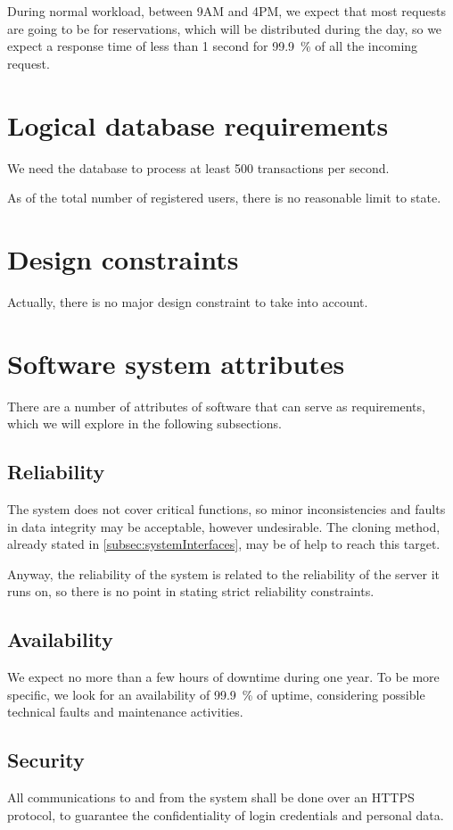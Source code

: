 During normal workload, between 9AM and 4PM, we expect that most requests are going to be for reservations, which will be distributed during the day, so we expect a response time of less than \num{1} second for \SI{99,9}{\percent} of all the incoming request.


\section{Logical database requirements}\label{sec:database}
We need the database to process at least \num{500} transactions per second.

As of the total number of registered users, there is no reasonable limit to state.


\section{Design constraints}
Actually, there is no major design constraint to take into account.


\section{Software system attributes}
There are a number of attributes of software that can serve as requirements, which we will explore in the following subsections.

\subsection{Reliability}
The system does not cover critical functions, so minor inconsistencies and faults in data integrity may be acceptable, however undesirable. The cloning method, already stated in \cref{subsec:systemInterfaces}, may be of help to reach this target. 

Anyway, the reliability of the system is related to the reliability of the server it runs on, so there is no point in stating strict reliability constraints.


\subsection{Availability}
We expect no more than a few hours of downtime during one year. To be more specific, we look for an availability of \SI{99,9}{\percent} of uptime, considering possible technical faults and maintenance activities. 


\subsection{Security}
All communications to and from the system shall be done over an HTTPS protocol, to guarantee the confidentiality of login credentials and personal data.

